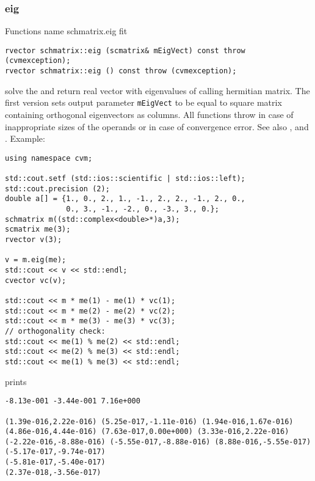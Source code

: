\subsubsection{eig}
Functions%
\pdfdest name {schmatrix.eig} fit
\begin{verbatim}
rvector schmatrix::eig (scmatrix& mEigVect) const throw (cvmexception);
rvector schmatrix::eig () const throw (cvmexception);
\end{verbatim}
solve the
and return  real vector with eigenvalues
of  calling hermitian matrix.
The first version
sets  output parameter \verb"mEigVect" to be equal
to  square matrix containing orthogonal
eigenvectors as columns.
All  functions
throw 
in case of inappropriate sizes of the operands
or in case of convergence error.
See also
,
 and
.
Example:
\begin{Verbatim}
using namespace cvm;

std::cout.setf (std::ios::scientific | std::ios::left); 
std::cout.precision (2);
double a[] = {1., 0., 2., 1., -1., 2., 2., -1., 2., 0.,
              0., 3., -1., -2., 0., -3., 3., 0.};
schmatrix m((std::complex<double>*)a,3);
scmatrix me(3);
rvector v(3);

v = m.eig(me);
std::cout << v << std::endl;
cvector vc(v);

std::cout << m * me(1) - me(1) * vc(1);
std::cout << m * me(2) - me(2) * vc(2);
std::cout << m * me(3) - me(3) * vc(3);
// orthogonality check:
std::cout << me(1) % me(2) << std::endl;
std::cout << me(2) % me(3) << std::endl;
std::cout << me(1) % me(3) << std::endl;
\end{Verbatim}
prints
\begin{Verbatim}
-8.13e-001 -3.44e-001 7.16e+000

(1.39e-016,2.22e-016) (5.25e-017,-1.11e-016) (1.94e-016,1.67e-016)
(4.86e-016,4.44e-016) (7.63e-017,0.00e+000) (3.33e-016,2.22e-016)
(-2.22e-016,-8.88e-016) (-5.55e-017,-8.88e-016) (8.88e-016,-5.55e-017)
(-5.17e-017,-9.74e-017)
(-5.81e-017,-5.40e-017)
(2.37e-018,-3.56e-017)
\end{Verbatim}
\newpage



